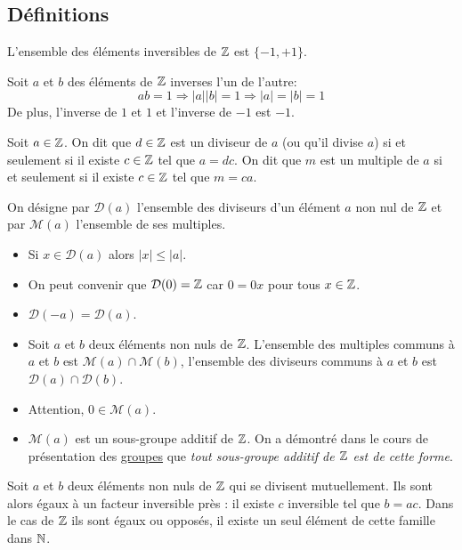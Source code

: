 \subsection{Définitions}
\begin{prop}[Inversibles]
 L'ensemble des éléments inversibles de $\mathbb{Z}$ est $\{-1,+1\}$. 
\end{prop}
\begin{demo}
  Soit $a$ et $b$ des éléments de $\mathbb{Z}$ inverses l'un de l'autre:
\begin{displaymath}
  ab = 1 \Rightarrow |a||b| = 1 \Rightarrow |a|=|b|=1
\end{displaymath}
De plus, l'inverse de $1$ et $1$ et l'inverse de $-1$ est $-1$.
\end{demo}
\begin{defi}
 Soit $a\in \mathbb{Z}$. On dit que $d\in \mathbb{Z}$ est un diviseur de $a$ (ou qu'il divise $a$) si et seulement si il existe $c\in\mathbb{Z}$ tel que $a=dc$. On dit que $m$ est un multiple de $a$ si et seulement si il existe $c\in \mathbb{Z}$ tel que $m=ca$.
\end{defi}
 \begin{nota}
  On désigne par $\mathcal D (a)$ l'ensemble des diviseurs d'un élément $a$ non nul de $\mathbb{Z}$ et par $\mathcal M (a)$ l'ensemble de ses multiples. 
 \end{nota}
\begin{rems}
\begin{itemize}
  \item Si $x\in \mathcal{D}(a)$ alors $|x|\leq |a|$.
  \item On peut convenir que $\mathcal{D}(0)=\mathbb{Z}$ car $0 = 0 x$ pour tous $x\in \mathbb{Z}$.
  \item $\mathcal{D}(-a)=\mathcal{D}(a)$.
  \item Soit $a$ et $b$ deux éléments non nuls de $\mathbb{Z}$. L'ensemble des multiples communs à $a$ et $b$ est $\mathcal M (a)\cap \mathcal M (b)$, l'ensemble des diviseurs communs à $a$ et $b$ est $\mathcal D (a)\cap \mathcal D (b)$.
  \item Attention, $0\in \mathcal{M}(a)$.
  \item $\mathcal{M}(a)$ est un sous-groupe additif de $\mathbb{Z}$. On a démontré dans le cours de présentation des \href{\baseurl C2075.pdf}{groupes} que \emph{tout sous-groupe additif de $\mathbb{Z}$ est de cette forme}.
\end{itemize}  
\end{rems}
\begin{prop}
 Soit $a$ et $b$ deux éléments non nuls de $\mathbb{Z}$ qui se divisent mutuellement. Ils sont alors égaux à un  facteur inversible près : il existe $c$ inversible tel que $b=ac$. Dans le cas de $\mathbb{Z}$ ils sont égaux ou opposés, il existe un seul élément de cette famille dans $\mathbb{N}$.
\end{prop}
